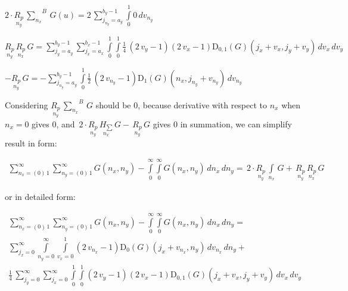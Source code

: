 \documentclass[11pt]{article}
\begin{document}
\(2\cdot\underset{n_y}{R_{p}}\,{\sum\limits_{n_x}^{}}^{B}\,G\left(u\right) = 2 \, {\sum\limits_{j_{n_{y}}=a_{y}}^{b_{y} - 1} \int\limits_{0}^{1} 0\,{d v_{n_{y}}}}\)

\(\underset{n_y}{R_{p}}\,\underset{n_x}{R_{p}}\,G = {\sum\limits_{j_{y}=a_{y}}^{b_{y} - 1} {\sum\limits_{j_{x}=a_{x}}^{b_{x} - 1} \int\limits_{0}^{1} \int\limits_{0}^{1} \frac{1}{4} \, {\left(2 \, v_{y} - 1\right)} {\left(2 \, v_{x} - 1\right)} \mathrm{D}_{0, 1}\left(G\right)\left(j_{x} + v_{x}, j_{y} + v_{y}\right)\,{d v_{x}}}\,{d v_{y}}}\)

\(-\underset{n_y}{R_{p}}\,G = -{\sum\limits_{j_{n_{y}}=a_{y}}^{b_{y} - 1} \int\limits_{0}^{1} \frac{1}{2} \, {\left(2 \, v_{n_{y}} - 1\right)} \mathrm{D}_{1}\left(G\right)\left(n_{x}, j_{n_{y}} + v_{n_{y}}\right)\,{d v_{n_{y}}}}\)

    Considering \(\underset{n_y}{R_{p}}\,{\sum\limits_{n_x}^{}}^{B}\,G\)
should be \(0\), because derivative with respect to \(n_x\) when
\(n_x = 0\) gives \(0\), and
\(\,2\cdot\underset{n_y}{R_{p}}\,\underset{n_x}{H_{\sum}}\,G -\,\underset{n_y}{R_{p}}\,G\)
gives \(0\) in summation, we can simplify result in form:

    \begin{equation}
\begin{array}{r}
\sum\limits_{n_x=\left(0\right)\,1}^{\infty}
\sum\limits_{n_y=\left(0\right)\,1}^{\infty}
G\left(n_x, n_y\right)
-
\int\limits_{0}^{\infty}
\int\limits_{0}^{\infty}
G\left(n_x, n_y\right)\,d{n_x}\,d{n_y} =
\,2\cdot\underset{n_y}{R_{p}}\,\int\limits_{n_x}^{}\,G 
+\,\underset{n_y}{R_{p}}\,\underset{n_x}{R_{p}}\,G
\end{array}
\end{equation}

    or in detailed form:

\begin{equation}
\begin{array}{l}
\sum\limits_{n_x=\left(0\right)\,1}^{\infty}
\sum\limits_{n_y=\left(0\right)\,1}^{\infty}
G\left(n_x, n_y\right)
-
\int\limits_{0}^{\infty}
\int\limits_{0}^{\infty}
G\left(n_x, n_y\right)\,d{n_x}\,d{n_y} = \\
{\sum\limits_{j_{x}=0}^{\infty} \int\limits_{n_{y}=0}^{\infty} \int\limits_{v_x=0}^{1}  {\left(2 \, v_{n_{x}} - 1\right)} \mathrm{D}_{0}\left(G\right)\left(j_{x} + v_{n_{x}}, n_{y}\right)\,{d v_{n_{x}}}\,{d n_{y}}} + \\
\frac{1}{4} \, {\sum\limits_{j_{y}=0}^{\infty} {\sum\limits_{j_{x}=0}^{\infty} \int\limits_{0}^{1} \int\limits_{0}^{1} {\left(2 \, v_{y} - 1\right)} {\left(2 \, v_{x} - 1\right)} \mathrm{D}_{0, 1}\left(G\right)\left(j_{x} + v_{x}, j_{y} + v_{y}\right)\,{d v_{x}}}\,{d v_{y}}}
\end{array}
\end{equation}
\end{document}
